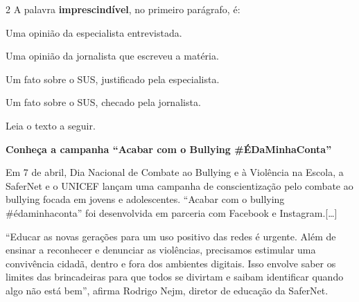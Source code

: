 \num{2} A palavra \textbf{imprescindível}, no primeiro parágrafo, é:

\begin{escolha}
\item Uma opinião da especialista entrevistada. 
\item Uma opinião da jornalista que escreveu a matéria.
\item Um fato sobre o SUS, justificado pela especialista.
\item Um fato sobre o SUS, checado pela jornalista.
\end{escolha}



Leia o texto a seguir.

\begin{myquote}
\begin{center}
\textbf{Conheça a campanha ``Acabar com o Bullying \#ÉDaMinhaConta''}
\end{center}

\noindent Em 7 de abril, Dia Nacional de Combate ao Bullying e à Violência na
Escola, a SaferNet e o UNICEF lançam uma campanha de conscientização
pelo combate ao bullying focada em jovens e adolescentes. ``Acabar com o
bullying \#édaminhaconta'' foi desenvolvida em parceria com Facebook e
Instagram.{[}\ldots{}{]}

``Educar as novas gerações para um uso positivo das redes é urgente.
Além de ensinar a reconhecer e denunciar as violências, precisamos
estimular uma convivência cidadã, dentro e fora dos ambientes digitais.
Isso envolve saber os limites das brincadeiras para que todos se
divirtam e saibam identificar quando algo não está bem'', afirma Rodrigo
Nejm, diretor de educação da SaferNet.

\end{myquote}

